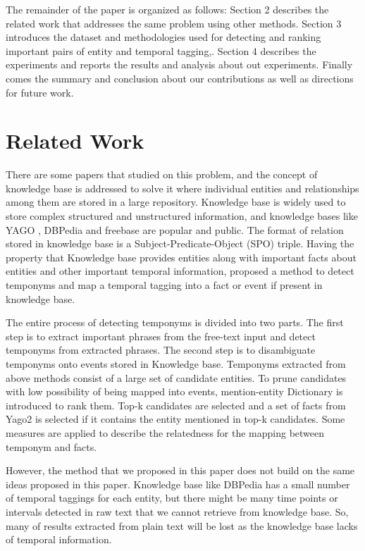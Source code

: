 \documentclass[12pt,a4paper]{article}
\begin{document}
The remainder of the paper is organized as follows: Section 2 describes the related work that addresses the same problem using other methods. Section 3 introduces the dataset and methodologies used for detecting and ranking important pairs of entity and temporal tagging,. Section 4 describes the experiments and reports the results and analysis about out experiments. Finally comes the summary and conclusion about our contributions as well as directions for future work.

\section{Related Work}
There are some papers that studied on this problem, and the concept of knowledge base is addressed to solve it where individual entities and relationships among them are stored in a large repository. Knowledge base is widely used to store complex structured and unstructured information, and knowledge bases like YAGO \cite{yago}, DBPedia \cite{dbpedia} and freebase \cite{freebase} are popular and public. The format of relation stored in knowledge base is a Subject-Predicate-Object (SPO) triple. Having the property that Knowledge base provides entities along with important facts about entities and other important temporal information,  \cite{Kuzey} proposed a method to detect temponyms and map a temporal tagging into a fact or event if present in knowledge base.

The entire process of detecting temponyms is divided into two parts. The first step is to extract important phrases from the free-text input and detect temponyms from extracted phrases. The second step is to disambiguate temponyms onto events stored in Knowledge base. Temponyms extracted from above methods consist of a large set of candidate entities. To prune candidates with low possibility of being mapped into events, mention-entity Dictionary is introduced to rank them. Top-k candidates are selected and a set of facts from Yago2 is selected if it contains the entity mentioned in top-k candidates. Some measures are applied to describe the relatedness for the mapping between temponym and facts. 

However, the method that we proposed in this paper does not build on the same ideas proposed in this paper. Knowledge base like DBPedia has a small number of temporal taggings for each entity, but there might be many time points or intervals detected in raw text that we cannot retrieve from knowledge base. So, many of results extracted from plain text will be lost as the knowledge base lacks of temporal information.
\end{document}
